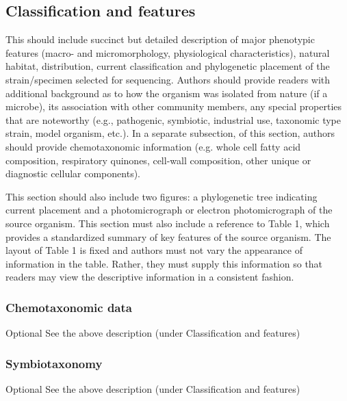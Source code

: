 \documentclass{bmcart}
\begin{document}
\subsection*{Classification and features}
This should include succinct but detailed description of major phenotypic features (macro- and micromorphology, physiological characteristics), natural habitat, distribution, current classification and phylogenetic placement of the strain/specimen selected for sequencing. Authors should provide readers with additional background as to how the organism was isolated from nature (if a microbe), its association with other community members, any special properties that are noteworthy (e.g., pathogenic, symbiotic, industrial use, taxonomic type strain, model organism, etc.). In a separate subsection, of this section, authors should provide chemotaxonomic information (e.g. whole cell fatty acid composition, respiratory quinones, cell-wall composition, other unique or diagnostic cellular components).

This section should also include two figures: a phylogenetic tree indicating current placement and a photomicrograph or electron photomicrograph of the source organism. This section must also include a reference to Table 1, which provides a standardized summary of key features of the source organism. The layout of Table 1 is fixed and authors must not vary the appearance of information in the table. Rather, they must supply this information so that readers may view the descriptive information in a consistent fashion.

\subsubsection*{Chemotaxonomic data}
Optional
See the above description (under Classification and features)

\subsubsection*{Symbiotaxonomy}
Optional
See the above description (under Classification and features)


\end{document}
